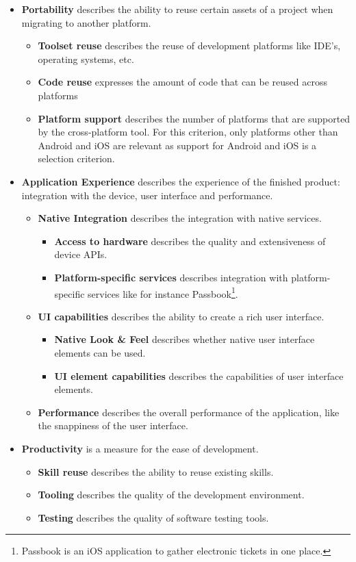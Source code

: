 \begin{itemize}
    \item \textbf{Portability} describes the ability to reuse certain assets of a project when migrating to another platform.
    \begin{itemize}
        \item \textbf{Toolset reuse} describes the reuse of development platforms like IDE's, operating systems, etc.
        \item \textbf{Code reuse} expresses the amount of code that can be reused across platforms
        \item \textbf{Platform support} describes the number of platforms that are supported by the cross-platform tool. For this criterion, only platforms other than Android and iOS are relevant as support for Android and iOS is a selection criterion.
    \end{itemize}
    \item \textbf{Application Experience} describes the experience of the finished product: integration with the device, user interface and performance.
    \begin{itemize}
        \item \textbf{Native Integration} describes the integration with native services.
        \begin{itemize}
            \item \textbf{Access to hardware} describes the quality and extensiveness of device APIs. 
            \item \textbf{Platform-specific services} describes integration with platform-specific services like for instance Passbook\footnote{Passbook is an iOS application to gather electronic tickets in one place.}.
        \end{itemize}
        \item \textbf{UI capabilities} describes the ability to create a rich user interface.
        \begin{itemize}
            \item \textbf{Native Look \& Feel} describes whether native user interface elements can be used.  
            \item \textbf{UI element capabilities} describes the capabilities of user interface elements.
        \end{itemize}
        \item \textbf{Performance} describes the overall performance of the application, like the snappiness of the user interface.
    \end{itemize}
    \item \textbf{Productivity} is a measure for the ease of development.
    \begin{itemize}
        \item \textbf{Skill reuse} describes the ability to reuse existing skills.
        \item \textbf{Tooling} describes the quality of the development environment.
        \item \textbf{Testing} describes the quality of software testing tools.
    \end{itemize}
\end{itemize}

